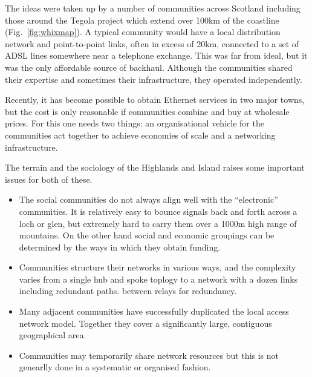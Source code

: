 The ideas were taken up by a number of communities across Scotland
including those around the Tegola project which extend over 100km of
the coastline (Fig.~\ref{fig:whixmap}). A typical community would have
a local distribution network and point-to-point links, often in excess
of 20km, connected to a set of ADSL lines somewhere near a telephone
exchange. This was far from ideal, but it was the only affordable
source of backhaul. Although the communities shared their expertise
and sometimes their infrastructure, they operated independently.

Recently, it has become possible to obtain Ethernet services in two
major towns, but the cost is only reasonable if communities combine
and buy at wholesale prices.  For this one needs two things: an
organisational vehicle for the communities act together to achieve
economies of scale and a networking infrastructure.

The terrain and the sociology of the Highlands and Island raises some
important issues for both of these.
\begin{itemize}
\item The social communities do not always align well with the
  ``electronic'' communities. It is relatively easy to bounce signals
  back and forth across a loch or glen, but extremely hard to carry
  them over a 1000m high range of mountains. On the other hand
  social and economic groupings can be determined by the ways in which
  they obtain funding.%
\item Communities structure their networks in various ways, and the
  complexity varies from a single hub and spoke toplogy to a network
  with a dozen links including redundant paths.
  between relays for redundancy.
\item Many adjacent communities have successfully duplicated the local
  access network model. Together they cover a significantly large,
  contiguous geographical area.
\item Communities may temporarily share network resources but this is
  not genearlly done in a systematic or organised fashion.
\end{itemize}

